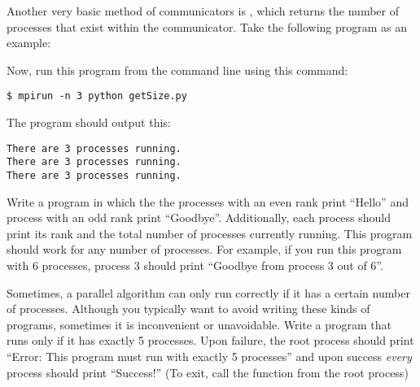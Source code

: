 Another very basic method of communicators is , which returns the number of processes that exist within the communicator.
Take the following program as an example:

Now, run this program from the command line using this command:
\begin{lstlisting}[style=ShellInput]
$ mpirun -n 3 python getSize.py
\end{lstlisting}
The program should output this:
\begin{lstlisting}[style=ShellOutput]
There are 3 processes running.
There are 3 processes running.
There are 3 processes running.
\end{lstlisting}

\begin{problem}
Write a program in which the the processes with an even rank print ``Hello'' and process with an odd rank print ``Goodbye''.
Additionally, each process should print its rank and the total number of processes currently running.
This program should work for any number of processes.
For example, if you run this program with 6 processes, process 3 should print ``Goodbye from process 3 out of 6''.
\end{problem}

\begin{problem}
Sometimes, a parallel algorithm can only run correctly if it has a certain number of processes.
Although you typically want to avoid writing these kinds of programs, sometimes it is
inconvenient or unavoidable. Write a program that runs only if it has exactly 5 processes.
Upon failure, the root process should print ``Error: This program must run with exactly 5 processes''
and upon success \emph{every} process should print ``Success!'' (To exit, call the function
 from the root process)
\end{problem}

